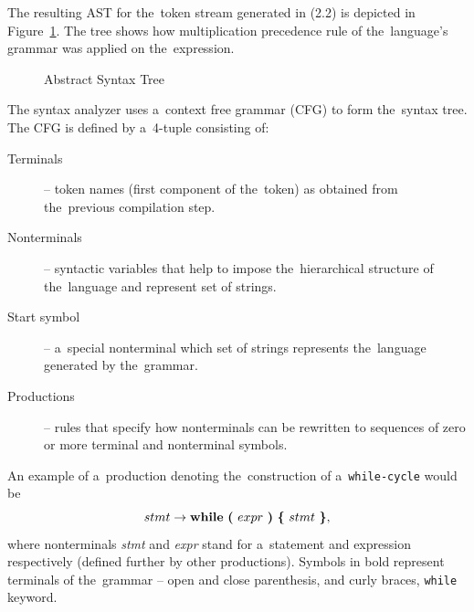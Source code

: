 \documentclass[
  digital, %
  table,   %
  lof,     %
  lot,     %
  oneside,
]{fithesis3}
\begin{document}
The resulting AST for the~token stream generated in (2.2) is depicted in Figure~\ref{fig:compilers-abstract-syntax-tree}. The tree shows how multiplication precedence rule of the~language's grammar was applied on the~expression.

\begin{figure}
  \centering
  \caption{Abstract Syntax Tree}
  \label{fig:compilers-abstract-syntax-tree}
\end{figure}

The syntax analyzer uses a~context free grammar (CFG) to form the~syntax tree. The CFG is defined by a~4-tuple consisting of:
\begin{description}
  \item[Terminals] -- token names (first component of the~token) as obtained from the~previous compilation step.
  \item[Nonterminals] -- syntactic variables that help to impose the~hierarchical structure of the~language and represent set of strings.
  \item[Start symbol] -- a~special nonterminal which set of strings represents the~language generated by the~grammar.
  \item[Productions] -- rules that specify how nonterminals can be rewritten to sequences of zero or more terminal and nonterminal symbols. 
\end{description}

An example of a~production denoting the~construction of a~\texttt{while-cycle} would be
\begin{equation}
  stmt 
  \rightarrow 
  \textbf{while}\ 
  \textbf{(}\ expr\ \textbf{)}\ 
  \textbf{\{}\ stmt\ \textbf{\}} 
  \textnormal{,}
\end{equation}
\noindent
where nonterminals \textit{stmt} and \textit{expr} stand for a~statement and expression respectively (defined further by other productions). Symbols in bold represent terminals of the~grammar -- open and close parenthesis, and curly braces, \texttt{while} keyword.
\end{document}
